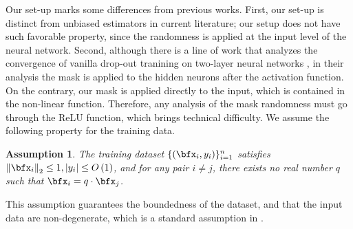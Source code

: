 \documentclass[10pt]{article} %
\theoremstyle{definition}
\theoremstyle{plain}
\newtheorem{assumption}[theorem]{Assumption}
\newcommand{\paren}[1]{\left(#1\right)}
\newcommand{\norm}[1]{\left\|#1\right\|}
\begin{document}
Our set-up marks some differences from previous works. 
First, our set-up is distinct from unbiased estimators in current literature; our setup does not have such favorable property, since the randomness is applied at the input level of the neural network. 
Second, although there is a line of work that analyzes the convergence of vanilla drop-out tranining on two-layer neural networks \citep{liao2022convergence, mianjy2020convergence}, in their analysis the mask is applied to the hidden neurons after the activation function. 
On the contrary, our mask is applied directly to the input, which is contained in the non-linear function. 
Therefore, any analysis of the mask randomness must go through the ReLU function, which brings technical difficulty. We assume the following property for the training data.
\begin{assumption}
    \label{asump:data}
    The training dataset $\{\paren{\bfx_i, y_i}\}_{i=1}^n$ satisfies $\norm{\bfx_i}_2\leq 1, \left|y_i\right| \leq O\paren{1}$, and for any pair $i\neq j$, there exists no real number $q$ such that $\bfx_i = q \cdot \bfx_j$.
\end{assumption}
This assumption guarantees the boundedness of the dataset, and that the input data are non-degenerate, which is a standard assumption in \cite{du2018gradient,song2020quadraticsufficesoverparametrizationmatrix,liao2022convergence}.
\end{document}
